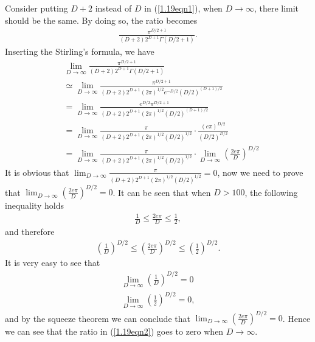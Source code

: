 \begin{answer}{}
	Consider putting $D + 2$ instead of $D$ in (\ref{1.19eqn1}), when $D \rightarrow \infty$, there limit should be the same. By doing so, the ratio becomes
	\begin{align}
		\frac{\pi^{D/2 + 1}}{(D+2)2^{D+1}\Gamma(D/2 + 1)}.
	\end{align}
	Inserting the Stirling's formula, we have
	\begin{align}\label{1.19eqn2}
		&\lim_{D \rightarrow \infty} \frac{\pi^{D/2 + 1}}{(D+2)2^{D+1}\Gamma(D/2 + 1)}\\
		&\simeq \lim_{D \rightarrow \infty} \frac{\pi^{D/2 + 1}}{(D+2)2^{D+1}(2\pi)^{1/2}e^{-{D/2}}(D/2)^{(D + 1)/2}}\\
		&= \lim_{D \rightarrow \infty}\frac{e^{D/2}\pi^{D/2 + 1}}{(D+2)2^{D+1}(2\pi)^{1/2}(D/2)^{(D + 1)/2}}\\
		&= \lim_{D \rightarrow \infty} \frac{\pi}{(D+2)2^{D+1}(2\pi)^{1/2}(D/2)^{1/2}} \cdot \frac{(e\pi)^{D/2}}{(D/2)^{D/2}}\\
		&= \lim_{D \rightarrow \infty} \frac{\pi}{(D+2)2^{D+1}(2\pi)^{1/2}(D/2)^{1/2}} \cdot \lim_{D \rightarrow \infty} \left(\frac{2e\pi}{D}\right)^{D/2}
	\end{align}
	It is obvious that $\lim_{D \rightarrow \infty} \frac{\pi}{(D+2)2^{D+1}(2\pi)^{1/2}(D/2)^{1/2}} = 0$, now we need to prove that $\lim_{D \rightarrow \infty} \left(\frac{2e\pi}{D}\right)^{D/2} = 0$. It can be seen that when $D > 100$, the following inequality holds
	\begin{align}
		\frac{1}{D} \leq \frac{2e\pi}{D} \leq \frac{1}{2},
	\end{align}
	and therefore
	\begin{align}
		\left(\frac{1}{D}\right)^{D/2} \leq \left(\frac{2e\pi}{D}\right)^{D/2} \leq \left(\frac{1}{2}\right)^{D/2}.
	\end{align}
	It is very easy to see that
	\begin{align}
		\lim_{D \rightarrow \infty} \left(\frac{1}{D}\right)^{D/2} = 0\\
		\lim_{D \rightarrow \infty} \left(\frac{1}{2}\right)^{D/2} = 0,
	\end{align}
	and by the squeeze theorem we can conclude that $\lim_{D \rightarrow \infty} \left(\frac{2e\pi}{D}\right)^{D/2} = 0$. Hence we can see that the ratio in (\ref{1.19eqn2}) goes to zero when $D \rightarrow \infty$.
	

\end{answer}
